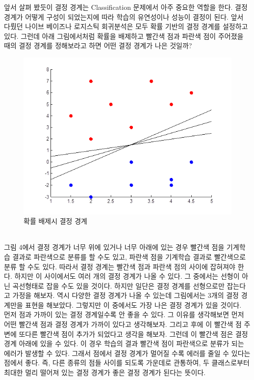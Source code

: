 \documentclass[a4paper]{oblivoir}
\begin{document}
\indent 앞서 살펴 봤듯이 결정 경계는 Classification 문제에서 아주 중요한 역할을 한다. 결정 경계가 어떻게 구성이 되었는지에 따라 학습의 유연성이나 성능이 결정이 된다. 앞서 다뤘던 나이브 베이즈나 로지스틱 회귀분석은 모두 확률 기반의 결정 경계를 설정하고 있다. 그런데 아래 그림에서처럼 확률을 배제하고 빨간색 점과 파란색 점이 주어졌을 때의 결정 경계를 정해보라고 하면 어떤 결정 경계가 나은 것일까?\\
\begin{figure}[ht]\centering
\includegraphics[scale=0.5]{Decision_withoutprob}\caption{확률 배제시 결정 경계}\label{Fig:5-4}
\end{figure}\\
\indent 그림 4에서 결정 경계가 너무 위에 있거나 너무 아래에 있는 경우 빨간색 점을 기계학습 결과로 파란색으로 분류를 할 수도 있고, 파란색 점을 기계학습 결과로 빨간색으로 분류 할 수도 있다. 따라서 결정 경계는 빨간색 점과 파란색 점의 사이에 잡혀져야 한다. 하지만 이 사이에서도 여러 개의 결정 경계가 나올 수 있다. 그 중에서는 선형이 아닌 곡선형태로 잡을 수도 있을 것이다. 하지만 일단은 결정 경계를 선형으로만 잡는다고 가정을 해보자. 역시 다양한 결정 경계가 나올 수 있는데 그림에서는 3개의 결정 경계만을 표현을 해보았다. 그렇지만 이 중에서도 가장 나은 결정 경계가 있을 것이다. \\
\indent 먼저 점과 가까이 있는 결정 경계일수록 안 좋을 수 있다. 그 이유를 생각해보면 먼저 어떤 빨간색 점과 결정 경계가 가까이 있다고 생각해보자. 그리고 후에 이 빨간색 점 주변에 또다른 빨간색 점이 추가가 되었다고 생각을 해보자. 그런데 이 빨간색 점은 결정 경계 아래에 있을 수 있다. 이 경우 학습의 결과 빨간색 점이 파란색으로 분류가 되는 에러가 발생할 수 있다. 그래서 점에서 결정 경계가 멀어질 수록 에러를 줄일 수 있다는 점에서 좋다. 즉, 다른 종류의 점들 사이를 되도록 가운데로 관통하여, 두 클래스로부터 최대한 멀리 떨어져 있는 결정 경계가 좋은 결정 경계가 된다는 뜻이다. \\
\end{document}
